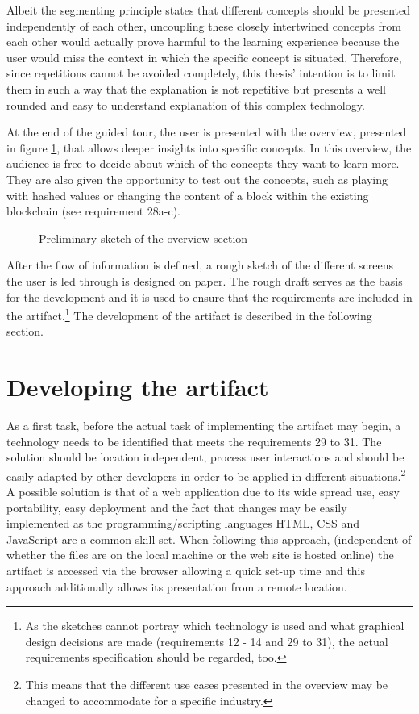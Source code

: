 Albeit the segmenting principle states that different concepts should be presented independently of each other, uncoupling these closely intertwined concepts from each other would actually prove harmful to the learning experience because the user would miss the context in which the specific concept is situated. Therefore, since repetitions cannot be avoided completely, this thesis' intention is to limit them in such a way that the explanation is not repetitive but presents a well rounded and easy to understand explanation of this complex technology.

At the end of the guided tour, the user is presented with the overview, presented in figure \ref{fig:OverviewPic}, that allows deeper insights into specific concepts.
In this overview, the audience is free to decide about which of the concepts they want to learn more. They are also given the opportunity to test out the concepts, such as playing with hashed values or changing the content of a block within the existing blockchain (see requirement 28a-c).

\begin{figure}
    \centering
    
    \caption{Preliminary sketch of the overview section}
    \label{fig:OverviewPic}
\end{figure}

After the flow of information is defined, a rough sketch of the different screens the user is led through is designed on paper. The rough draft serves as the basis for the development and it is used to ensure that the requirements are included in the artifact.\footnote{ As the sketches cannot portray which technology is used and what graphical design decisions are made (requirements 12 - 14 and 29 to 31), the actual requirements specification should be regarded, too.} The development of the artifact is described in the following section.

\section{Developing the artifact}

As a first task, before the actual task of implementing the artifact may begin, a technology needs to be identified that meets the requirements 29 to 31. The solution should be location independent, process user interactions and should be easily adapted by other developers in order to be applied in different situations.\footnote{ This means that the different use cases presented in the overview may be changed to accommodate for a specific industry.} A possible solution is that of a web application due to its wide spread use, easy portability, easy deployment and the fact that changes may be easily implemented as the programming/scripting languages HTML, CSS and JavaScript are a common skill set. When following this approach, (independent of whether the files are on the local machine or the web site is hosted online) the artifact is accessed via the browser allowing a quick set-up time and this approach additionally allows its presentation from a remote location.



